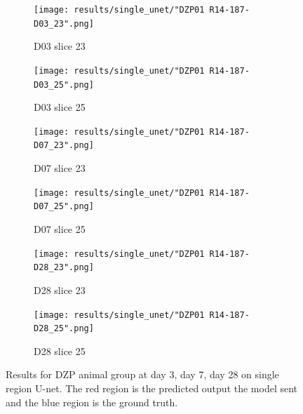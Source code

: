 \begin{figure}[!htb]  
\centering %
\begin{subfigure}{0.35\textwidth}
  \texttt{[image: results/single\_unet/"DZP01 R14-187-D03\_23".png]}
  \caption{D03 slice 23}
\end{subfigure}\hfil
\begin{subfigure}{0.35\textwidth}
  \texttt{[image: results/single\_unet/"DZP01 R14-187-D03\_25".png]}
  \caption{D03 slice 25}
\end{subfigure}

\medskip
\begin{subfigure}{0.35\textwidth}
  \texttt{[image: results/single\_unet/"DZP01 R14-187-D07\_23".png]}
  \caption{D07 slice 23}
\end{subfigure}\hfil
\begin{subfigure}{0.35\textwidth}
  \texttt{[image: results/single\_unet/"DZP01 R14-187-D07\_25".png]}
  \caption{D07 slice 25}
\end{subfigure}

\medskip
\begin{subfigure}{0.35\textwidth}
  \texttt{[image: results/single\_unet/"DZP01 R14-187-D28\_23".png]}
  \caption{D28 slice 23}
\end{subfigure}\hfil
\begin{subfigure}{0.35\textwidth}
  \texttt{[image: results/single\_unet/"DZP01 R14-187-D28\_25".png]}
  \caption{D28 slice 25}
\end{subfigure}
  
  \caption{Results for DZP animal group at day 3, day 7, day 28 on single region U-net. The red region is the predicted output the model sent and the blue region is the ground truth.}
  \label{fig:results_single_unet_DZP}
\end{figure}



